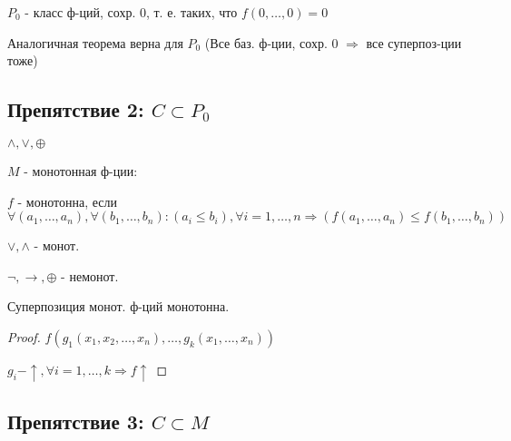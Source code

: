 \begin{definition}
$P_0$ - класс ф-ций, сохр. 0, т. е. таких, что $f(0, \ldots, 0) = 0$

Аналогичная теорема верна для $P_0$ (Все баз. ф-ции, сохр. 0 $\Rightarrow$ все суперпоз-ции тоже)
\end{definition}
\subsection{Препятствие 2: $C \subset P_0$}
\begin{example}
 $\land, \lor, \oplus $
\end{example}

\begin{definition}
$M$ - монотонная ф-ции:

$f$ - монотонна, если $\forall (a_1, \ldots, a_n), \forall (b_1, \ldots, b_n) \colon (a_i \leq b_i), \forall i=1,\ldots,n \Rightarrow (f(a_1, \ldots, a_n) \leq f(b_1, \ldots, b_n))$
\end{definition}

\begin{example}
$\lor, \land$ - монот.

$\neg, \rightarrow, \oplus $ - немонот.
\end{example}
\begin{statement}
Суперпозиция монот. ф-ций монотонна.
\end{statement}
\begin{proof}
$f(g_1(x_1, x_2, \ldots, x_n), \ldots, g_k(x_1, \ldots, x_n))$

$g_i - \uparrow, \forall i = 1, \ldots , k \Rightarrow f \uparrow$
\end{proof}
\subsection{Препятствие 3: $C \subset M$}
